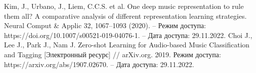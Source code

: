 \begin{thebibliography}{99}
 Kim, J., Urbano, J., Liem, C.C.S. et al. One deep music representation to rule them all? A comparative analysis of different representation learning strategies. Neural Comput \& Applic 32, 1067–1093 (2020). -- Режим доступа: https://doi.org/10.1007/s00521-019-04076-1. -- Дата доступа: 29.11.2022.
 Choi J., Lee J., Park J., Nam J. Zero-shot Learning for Audio-based Music Classification and Tagging [Электронный ресурс] // arXiv.org. 2019. Режим доступа: https://arxiv.org/abs/1907.02670. -- Дата доступа: 29.11.2022.
\end{thebibliography}

